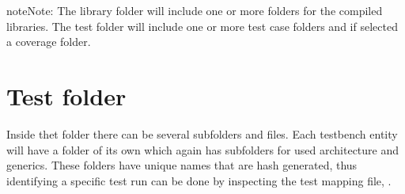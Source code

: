 \documentclass[letterpaper,10pt,english]{sphinxmanual}
\begin{document}
\begin{sphinxadmonition}{note}{Note:}
\sphinxAtStartPar
The library folder will include one or more folders for the compiled libraries.
The test folder will include one or more test case folders and \sphinxhyphen{} if selected \sphinxhyphen{} a coverage folder.
\end{sphinxadmonition}


\section{Test folder}
\label{\detokenize{output:test-folder}}
\sphinxAtStartPar
Inside thet  folder there can be several sub\sphinxhyphen{}folders and files. Each testbench entity will have a folder of its own
which again has sub\sphinxhyphen{}folders for used architecture and generics. These  folders have unique names that are
hash generated, thus identifying a specific test run can be done by inspecting the test mapping file, .
\def\sphinxLiteralBlockLabel{\label{\detokenize{output:id1}}}
\end{document}
